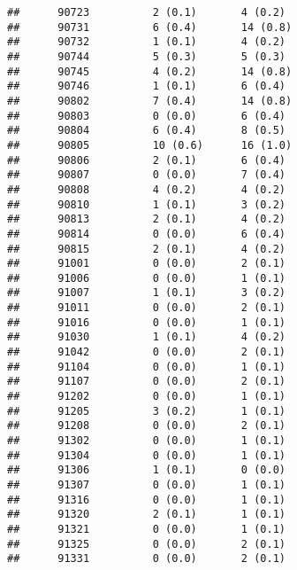 \documentclass[]{article}
\begin{document}
\begin{verbatim}
##      90723          2 (0.1)       4 (0.2)                        
##      90731          6 (0.4)       14 (0.8)                       
##      90732          1 (0.1)       4 (0.2)                        
##      90744          5 (0.3)       5 (0.3)                        
##      90745          4 (0.2)       14 (0.8)                       
##      90746          1 (0.1)       6 (0.4)                        
##      90802          7 (0.4)       14 (0.8)                       
##      90803          0 (0.0)       6 (0.4)                        
##      90804          6 (0.4)       8 (0.5)                        
##      90805          10 (0.6)      16 (1.0)                       
##      90806          2 (0.1)       6 (0.4)                        
##      90807          0 (0.0)       7 (0.4)                        
##      90808          4 (0.2)       4 (0.2)                        
##      90810          1 (0.1)       3 (0.2)                        
##      90813          2 (0.1)       4 (0.2)                        
##      90814          0 (0.0)       6 (0.4)                        
##      90815          2 (0.1)       4 (0.2)                        
##      91001          0 (0.0)       2 (0.1)                        
##      91006          0 (0.0)       1 (0.1)                        
##      91007          1 (0.1)       3 (0.2)                        
##      91011          0 (0.0)       2 (0.1)                        
##      91016          0 (0.0)       1 (0.1)                        
##      91030          1 (0.1)       4 (0.2)                        
##      91042          0 (0.0)       2 (0.1)                        
##      91104          0 (0.0)       1 (0.1)                        
##      91107          0 (0.0)       2 (0.1)                        
##      91202          0 (0.0)       1 (0.1)                        
##      91205          3 (0.2)       1 (0.1)                        
##      91208          0 (0.0)       2 (0.1)                        
##      91302          0 (0.0)       1 (0.1)                        
##      91304          0 (0.0)       1 (0.1)                        
##      91306          1 (0.1)       0 (0.0)                        
##      91307          0 (0.0)       1 (0.1)                        
##      91316          0 (0.0)       1 (0.1)                        
##      91320          2 (0.1)       1 (0.1)                        
##      91321          0 (0.0)       1 (0.1)                        
##      91325          0 (0.0)       2 (0.1)                        
##      91331          0 (0.0)       2 (0.1)                        

\end{verbatim}
\end{document}
